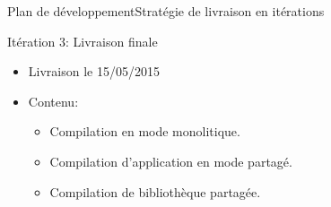     \begin{frame}{Plan de développement}{Stratégie de livraison en itérations}
      \begin{block}{Itération 3: Livraison finale}
       
           \begin{itemize}
             \item<1-> Livraison le 15/05/2015
             \item<2-> Contenu: 
              \begin{itemize}
                \item<3-> Compilation en mode monolitique.
                \item<4-> Compilation d'application en mode partagé.
                \item<5-> Compilation de bibliothèque partagée.
              \end{itemize}
           \end{itemize}
        
      \end{block}
    \end{frame}
